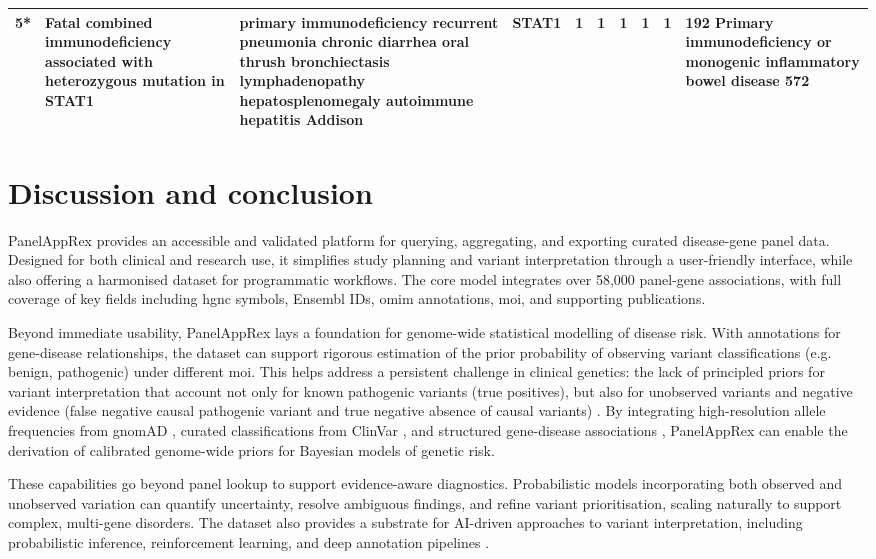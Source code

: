 \begin{table}[htbp]
{\begin{tabular}{|
    p{1cm}|
    p{4cm}|
    p{4cm}|
    p{1.4cm}|
    p{1.2cm}|
    p{1.2cm}|
    p{1.2cm}|
    p{1.2cm}|
    p{1.2cm}|
    p{5cm}|}
\hline																			
5*	\cite{sharfe_fatal_2014}	 & 	Fatal combined immunodeficiency associated with heterozygous mutation in STAT1	 & 	primary immunodeficiency recurrent pneumonia chronic diarrhea oral thrush bronchiectasis lymphadenopathy hepatosplenomegaly autoimmune hepatitis Addison	 & 	STAT1	 & 	1	 & 	1	 & 	1	 & 	1	 & 	1	 & 	192 Primary immunodeficiency or monogenic inflammatory bowel disease 572 \\
\hline
\end{tabular}
}
\end{table}

\FloatBarrier
\section{Discussion and conclusion}
\noindent
PanelAppRex provides an accessible and validated platform for querying, aggregating, and exporting curated disease-gene panel data. Designed for both clinical and research use, it simplifies study planning and variant interpretation through a user-friendly interface, while also offering a harmonised dataset for programmatic workflows. The core model integrates over 58,000 panel-gene associations, with full coverage of key fields including \ac{hgnc} symbols, Ensembl IDs, \ac{omim} annotations, \ac{moi}, and supporting publications.

Beyond immediate usability, PanelAppRex lays a foundation for genome-wide statistical modelling of disease risk. 
With annotations for gene-disease relationships, the dataset can support rigorous estimation of the prior probability of observing  variant classifications (e.g. benign, pathogenic) under different \ac{moi}.
This helps address a persistent challenge in clinical genetics: the lack of principled priors for variant interpretation that account not only for known pathogenic variants (true positives), but also for unobserved variants and negative evidence (false negative causal pathogenic variant and true negative absence of causal variants) \cite{hannah_using_2024, zschocke_mendelian_2023}. 
By integrating high-resolution allele frequencies from gnomAD \cite{karczewski2020mutational}, curated classifications from ClinVar \cite{landrum_clinvar_2018}, and structured gene-disease associations \cite{martin_panelapp_2019}, 
PanelAppRex can enable the derivation of calibrated genome-wide priors for Bayesian models of genetic risk.

These capabilities go beyond panel lookup to support evidence-aware diagnostics. 
Probabilistic models incorporating both observed and unobserved variation can quantify uncertainty, resolve ambiguous findings, and refine variant prioritisation, scaling naturally to support complex, multi-gene disorders. 
The dataset also provides a substrate for AI-driven approaches to variant interpretation, including probabilistic inference, reinforcement learning, and deep annotation pipelines
\cite{jumper_highly_2021, cheng_accurate_2023}.

